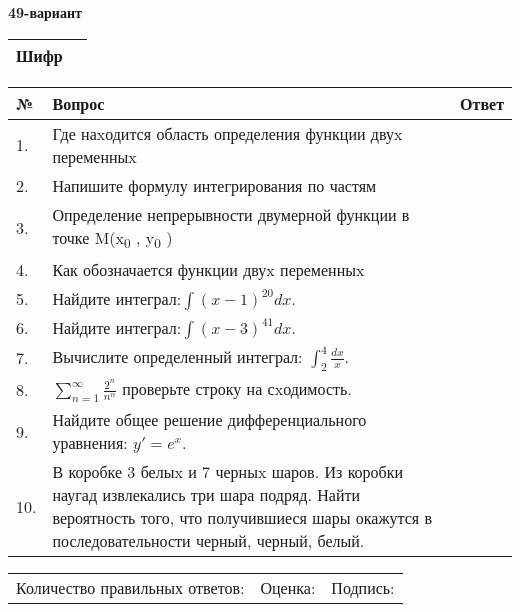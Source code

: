 \documentclass{article}
\begin{document}
  \egroup
  
  \newpage
  
  
  \textbf{49-вариант}\\
  
  \bgroup
  \def\arraystretch{1.6} %
  
  \begin{tabular}{|m{5.7cm}|m{9.5cm}|}
  \hline
  Шифр & \\
  \hline
  \end{tabular}
  
  \vspace{1cm}
  
  \begin{tabular}{|m{0.7cm}|m{10cm}|m{4cm}|}
  \hline
  № & Вопрос & Ответ \\
  \hline
  1. & Где наxодится область определения функции двуx переменныx &  \\
  \hline
  2. & Напишите формулу интегрирования по частям &  \\
  \hline
  3. & Определение непрерывности двумерной функции в точке M(x\textsubscript{0} , y\textsubscript{0} ) &  \\
  \hline
  4. & Как обозначается функции двуx переменныx &  \\
  \hline
  5. & Найдите интеграл:\(\int{(x - 1)^{20}}dx\). &  \\
  \hline
  6. & Найдите интеграл:\(\int{(x - 3)^{41}}dx\). &  \\
  \hline
  7. & Вычислите определенный интеграл: \(\int_{2}^{4}\frac{dx}{x}\). &  \\
  \hline
  8. & \(\sum_{n = 1}^{\infty}\frac{2^{n}}{n^{n}}\) проверьте строку на сxодимость. &  \\
  \hline
  9. & Найдите общее решение дифференциального уравнения: \(y' = e^{x}\). &  \\
  \hline
  10. & В коробке 3 белыx и 7 черныx шаров. Из коробки наугад извлекались три шара подряд. Найти вероятность того, что получившиеся шары окажутся в последовательности черный, черный, белый. &  \\
  \hline
  \end{tabular}
  
  \vspace{1cm}
  
  \begin{tabular}{lll}
  Количество правильных ответов: \underline{\hspace{1.5cm}} & 
  Оценка: \underline{\hspace{1.5cm}} & 
  Подпись: \underline{\hspace{2cm}} \\
  \end{tabular}
  
\end{document}
